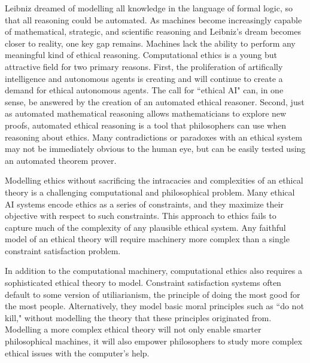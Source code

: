 %
\begin{isabellebody}%
%
%
\isadelimtheory
%
\endisadelimtheory
%
\isatagtheory
%
\endisatagtheory
{\isafoldtheory}%
%
\isadelimtheory
%
\endisadelimtheory
%
\isadelimdocument
%
\endisadelimdocument
%
\isatagdocument
%
\isamarkuptrue%
%
\endisatagdocument
{\isafolddocument}%
%
\isadelimdocument
%
\endisadelimdocument
%
\begin{isamarkuptext}%
Leibniz dreamed of modelling all knowledge in the language of formal logic, so that all 
reasoning could be automated. As machines become increasingly capable of mathematical, strategic, 
and scientific reasoning and Leibniz's dream becomes closer to reality, one key gap remains.
Machines lack the ability to perform any meaningful kind of ethical reasoning. Computational 
ethics is a young but attractive field for two primary reasons. First, the proliferation of 
artifically intelligence and autonomous agents is creating and will continue to create a demand for 
ethical autonomous agents. The call for ``ethical AI" can, in one sense, be answered by the creation 
of an automated ethical reasoner. Second, just as automated mathematical reasoning allows mathematicians 
to explore new proofs, automated ethical reasoning is a tool that philosophers can use when reasoning 
about ethics. Many contradictions or paradoxes with an ethical system may not be immediately obvious 
to the human eye, but can be easily tested using an automated theorem prover.

Modelling ethics without sacrificing the intracacies and complexities of an ethical theory is a 
challenging computational and philosophical problem. Many ethical AI systems encode ethics as a series 
of constraints, and they maximize their objective with respect to such constraints. This approach to 
ethics fails to capture much of the complexity of any plausible ethical system. Any faithful model
of an ethical theory will require machinery more complex than a single constraint satisfaction problem.

In addition to the computational machinery, computational ethics also requires a sophisticated 
ethical theory to model. Constraint satisfaction systems often default to some version of utiliarianism, 
the principle of doing the most good for the most people. Alternatively, they model basic moral 
principles such as ``do not kill," without modelling the theory that these principles originated from.
Modelling a more complex ethical theory will not only enable smarter philosophical machines, it will
also empower philosophers to study more complex ethical issues with the computer's help.


\end{isamarkuptext}
\end{isabellebody}
